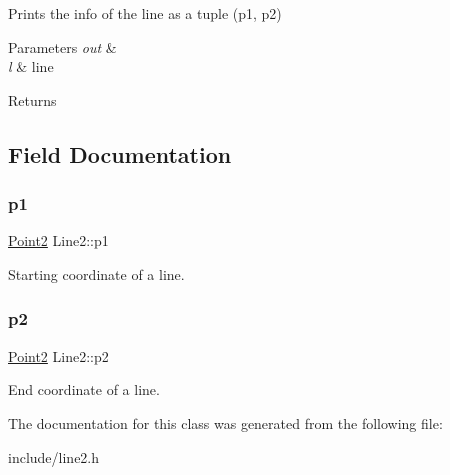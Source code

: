 Prints the info of the line as a tuple (p1, p2) 


\begin{DoxyParams}{Parameters}
{\em out} & \\
\hline
{\em l} & line \\
\hline
\end{DoxyParams}
\begin{DoxyReturn}{Returns}

\end{DoxyReturn}


\subsection{Field Documentation}
\mbox{\label{class_line2_a050658f54921e102d7ce6ae59a03584e}} 
\subsubsection{\texorpdfstring{p1}{p1}}
{\footnotesize\ttfamily \mbox{\hyperlink{class_point2}{Point2}} Line2\+::p1}



Starting coordinate of a line. 

\mbox{\label{class_line2_a5bc874958132ebdc2fe18aced3a35e72}} 
\subsubsection{\texorpdfstring{p2}{p2}}
{\footnotesize\ttfamily \mbox{\hyperlink{class_point2}{Point2}} Line2\+::p2}



End coordinate of a line. 



The documentation for this class was generated from the following file\+:\begin{DoxyCompactItemize}
\item 
include/line2.\+h\end{DoxyCompactItemize}
